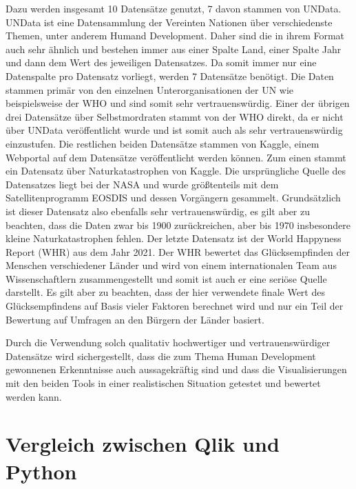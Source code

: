 \documentclass[12pt]{article}
\begin{document}
	Dazu werden insgesamt 10 Datensätze genutzt, 7 davon stammen von UNData. UNData ist eine Datensammlung der Vereinten Nationen über verschiedenste Themen, unter anderem Humand Development. Daher sind die in ihrem Format auch sehr ähnlich und bestehen immer aus einer Spalte Land, einer Spalte Jahr und dann dem Wert des jeweiligen Datensatzes. Da somit immer nur eine Datenspalte pro Datensatz vorliegt, werden 7 Datensätze benötigt. Die Daten stammen primär von den einzelnen Unterorganisationen der UN wie beispielsweise der WHO und sind somit sehr vertrauenswürdig. Einer der übrigen drei Datensätze über Selbstmordraten stammt von der WHO direkt, da er nicht über UNData veröffentlicht wurde und ist somit auch als sehr vertrauenswürdig einzustufen. Die restlichen beiden Datensätze stammen von Kaggle, einem Webportal auf dem Datensätze veröffentlicht werden können. Zum einen stammt ein Datensatz über Naturkatastrophen von Kaggle. Die ursprüngliche Quelle des Datensatzes liegt bei der NASA und wurde größtenteils mit dem Satellitenprogramm EOSDIS und dessen Vorgängern gesammelt. Grundsätzlich ist dieser Datensatz also ebenfalls sehr vertrauenswürdig, es gilt aber zu beachten, dass die Daten zwar bis 1900 zurückreichen, aber bis 1970 insbesondere kleine Naturkatastrophen fehlen. Der letzte Datensatz ist der World Happyness Report (WHR) %
	aus dem Jahr 2021. Der WHR bewertet das Glücksempfinden der Menschen verschiedener Länder und wird von einem internationalen Team aus Wissenschaftlern zusammengestellt und somit ist auch er eine seriöse Quelle darstellt. Es gilt aber zu beachten, dass der hier verwendete finale Wert des Glücksempfindens auf Basis vieler Faktoren berechnet wird und nur ein Teil der Bewertung auf Umfragen an den Bürgern der Länder basiert.
	
	Durch die Verwendung solch qualitativ hochwertiger und vertrauenswürdiger Datensätze wird sichergestellt, dass die zum Thema Human Development gewonnenen Erkenntnisse auch aussagekräftig sind und dass die Visualisierungen mit den beiden Tools in einer realistischen Situation getestet und bewertet werden kann.
	\section{Vergleich zwischen Qlik und Python}
	
\end{document}
